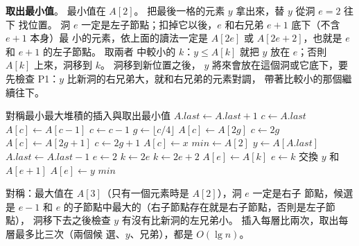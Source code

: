\textbf{取出最小值}。 最小值在 $A[2]$。 把最後一格的元素 $y$ 拿出來，替 $y$ 從洞 $e = 2$ 往下
找位置。 洞 $e$ 一定是左子節點；扣掉它以後，$e$ 和右兄弟 $e + 1$ 底下（不含 $e + 1$ 本身）最
小的元素，依上面的讀法一定是 $A[2e]$ 或 $A[2e + 2]$，也就是 $e$ 和 $e + 1$ 的左子節點。 取兩者
中較小的 $k$：$y \le A[k]$ 就把 $y$ 放在 $e$；否則 $A[k]$ 上來，洞移到 $k$。 洞移到新位置之後，
$y$ 將來會放在這個洞或它底下，要先檢查 P1：$y$ 比新洞的右兄弟大，就和右兄弟的元素對調，
帶著比較小的那個繼續往下。

\begin{pseudo}[label=alg:hp-smmh]{對稱最小最大堆積的插入與取出最小值}
    \State $A.\mathit{last} \gets A.\mathit{last} + 1$
    \State $c \gets A.\mathit{last}$
     
        \State $A[c] \gets A[c - 1]$
        \State $c \gets c - 1$
    \EndIf
        \State $g \gets \lfloor c/4 \rfloor$ 
         
            \State $A[c] \gets A[2g]$
            \State $c \gets 2g$
         
            \State $A[c] \gets A[2g + 1]$
            \State $c \gets 2g + 1$
        \Else
            \State \Break
        \EndIf
    \EndWhile
    \State $A[c] \gets x$
\EndProcedure
\Statex
{} 
    \State $\mathit{min} \gets A[2]$
    \State $y \gets A[A.\mathit{last}]$
    \State $A.\mathit{last} \gets A.\mathit{last} - 1$
        \State $e \gets 2$ 
            \State $k \gets 2e$
                \State $k \gets 2e + 2$
            \EndIf
                \State \Break
            \EndIf
            \State $A[e] \gets A[k]$
            \State $e \gets k$
             
                \State 交換 $y$ 和 $A[e + 1]$
            \EndIf
        \EndWhile
        \State $A[e] \gets y$
    \EndIf
    \State \Return $\mathit{min}$
\EndFunction
\end{pseudo}

 對稱：最大值在 $A[3]$（只有一個元素時是 $A[2]$），洞 $e$ 一定是右子
節點，候選是 $e - 1$ 和 $e$ 的子節點中最大的（右子節點存在就是右子節點，否則是左子節點），
洞移下去之後檢查 $y$ 有沒有比新洞的左兄弟小。 插入每層比兩次，取出每層最多比三次（兩個候
選、$y$、兄弟），都是 $O(\lg n)$。

